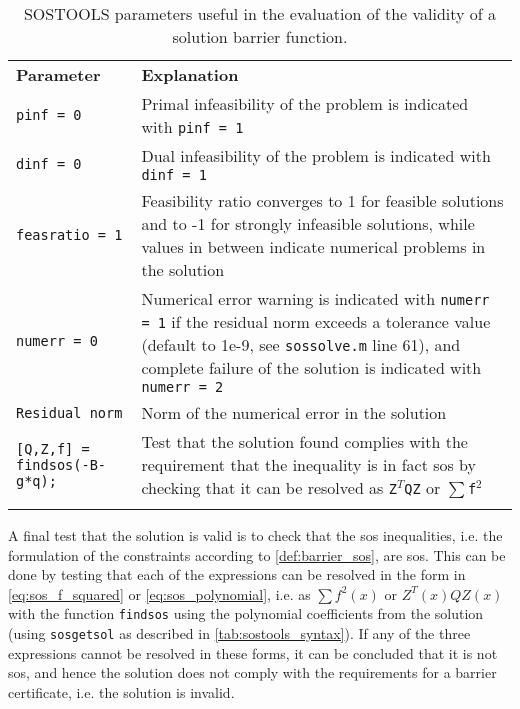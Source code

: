 \begin{table}[H]
	\begin{tabularx}{\textwidth}{p{3.5cm} X}
		\rowcolor{HeaderBlue}
	\textbf{Parameter} & \textbf{Explanation}\\	
		\texttt{pinf = 0} & Primal infeasibility of the problem is indicated with \texttt{pinf = 1}\\
		\rowcolor{textBlue}
		\texttt{dinf = 0} & Dual infeasibility of the problem is indicated with \texttt{dinf = 1}\\
		\texttt{feasratio = 1} & Feasibility ratio converges to 1 for feasible solutions and to -1 for strongly infeasible solutions, while values in between indicate numerical problems in the solution\\
		\rowcolor{textBlue}
		\texttt{numerr = 0} & Numerical error warning is indicated with \texttt{numerr = 1} if the residual norm exceeds a tolerance value (default to 1e-9, see \texttt{sossolve.m} line 61), and complete failure of the solution is indicated with \texttt{numerr = 2}\\
		\texttt{Residual norm} & Norm of the numerical error in the solution \\
		\rowcolor{textBlue}
		\texttt{[Q,Z,f] = findsos(-B-g*q);} &  Test that the solution found complies with the requirement that the inequality is in fact \gls{sos} by checking that it can be resolved as \texttt{Z}$^T$\texttt{QZ} or $\sum$\texttt{f}$^2$\\
		\rowcolor{textBlue}
	\end{tabularx}
	\caption{SOSTOOLS parameters useful in the evaluation of the validity of a solution  barrier function.}
	\label{tab:sostools_evaluation}
\end{table}

A final test that the solution is valid is to check that the \gls{sos} inequalities, i.e. the formulation of the constraints according to \autoref{def:barrier_sos}, are \gls{sos}. This can be done by testing that each of the expressions can be resolved in the form in \autoref{eq:sos_f_squared} or \autoref{eq:sos_polynomial}, i.e. as $\sum f^2(x)$ or $Z^T(x)QZ(x)$ with the function \texttt{findsos} using the polynomial coefficients from the solution (using \texttt{sosgetsol} as described in \autoref{tab:sostools_syntax}). If any of the three expressions cannot be resolved in these forms, it can be concluded that it is not \gls{sos}, and hence the solution does not comply with the requirements for a barrier certificate, i.e. the solution is invalid.